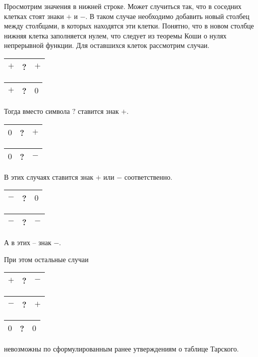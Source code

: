 Просмотрим значения в нижней строке. Может случиться так, что в соседних клетках стоят знаки $+$ и $-$. В таком случае необходимо добавить новый столбец между столбцами, в которых находятся эти клетки. Понятно, что в новом столбце нижняя клетка заполняется нулем, что следует из теоремы Коши о нулях непрерывной функции. Для оставшихся клеток рассмотрим случаи.
\begin{center}
    \begin{tabular}{|c|c|c|}
        \hline
        $+$ & ? & $+$\\
        \hline
    \end{tabular}
        \quad
    \begin{tabular}{|c|c|c|}
        \hline
        $+$ & ? & $0$\\
        \hline
    \end{tabular}           
\end{center}
Тогда вместо символа $?$ ставится знак $+$.
\begin{center}
    \begin{tabular}{|c|c|c|}
        \hline
        $0$ & ? & $+$\\
        \hline
    \end{tabular}
        \quad
    \begin{tabular}{|c|c|c|}
        \hline
        $0$ & ? & $-$\\
        \hline
    \end{tabular}           
\end{center}
В этих случаях ставится знак $+$ или $-$ соответственно.
\begin{center}
    \begin{tabular}{|c|c|c|}
        \hline
        $-$ & ? & $0$\\
        \hline
    \end{tabular}
        \quad
    \begin{tabular}{|c|c|c|}
        \hline
        $-$ & ? & $-$\\
        \hline
    \end{tabular}           
\end{center}
А в этих -- знак $-$.

При этом остальные случаи
\begin{center}
    \begin{tabular}{|c|c|c|}
        \hline
        $+$ & ? & $-$\\
        \hline
    \end{tabular}
        \quad
    \begin{tabular}{|c|c|c|}
        \hline
        $-$ & ? & $+$\\
        \hline
    \end{tabular} 
        \quad
    \begin{tabular}{|c|c|c|}
        \hline
        $0$ & ? & $0$\\
        \hline
    \end{tabular}          
\end{center}
невозможны по сформулированным ранее утверждениям о таблице Тарского.

